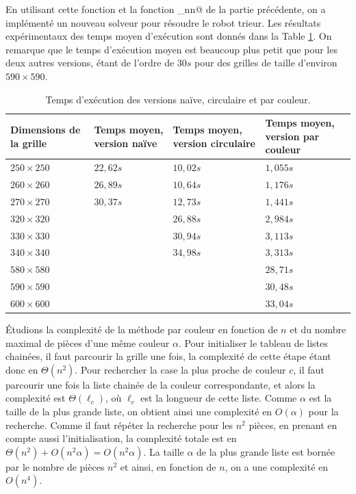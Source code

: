 \documentclass[a4paper,12pt]{article}
\numberwithin{equation}{section}
\begin{document}
En utilisant cette fonction et la fonction \verb@Recherche@\allowbreak\verb@CaseCirculaire_nn@ de la partie précédente, on a implémenté un nouveau solveur pour résoudre le robot trieur. Les résultats expérimentaux des temps moyen d'exécution sont donnés dans la Table \ref{TempsCouleur}. On remarque que le temps d'exécution moyen est beaucoup plus petit que pour les deux autres versions, étant de l'ordre de $30 s$ pour des grilles de taille d'environ $590 \times 590$.

\begin{table}[ht]
\centering
\begin{tabular}{>{\centering} m{} >{\centering} m{} >{\centering} m{} >{\centering} m{}}
\hline\hline
Dimensions de la grille & Temps moyen, version naïve & Temps moyen, version circulaire & Temps moyen, version par couleur \tabularnewline
\hline
$250 \times 250$ & $22,62 s$ & $10,02 s$ & $1,055 s$ \tabularnewline
$260 \times 260$ & $26,89 s$ & $10,64 s$ & $1,176 s$ \tabularnewline
$270 \times 270$ & $30,37 s$ & $12,73 s$ & $1,441 s$ \tabularnewline
$320 \times 320$ &           & $26,88 s$ & $2,984 s$ \tabularnewline
$330 \times 330$ &           & $30,94 s$ & $3,113 s$ \tabularnewline
$340 \times 340$ &           & $34,98 s$ & $3,313 s$ \tabularnewline
$580 \times 580$ &           &           & $28,71 s$ \tabularnewline
$590 \times 590$ &           &           & $30,48 s$ \tabularnewline
$600 \times 600$ &           &           & $33,04 s$ \tabularnewline
\hline\hline
\end{tabular}
\caption{Temps d'exécution des versions naïve, circulaire et par couleur.}
\label{TempsCouleur}
\end{table}

Étudions la complexité de la méthode par couleur en fonction de $n$ et du nombre maximal de pièces d'une même couleur $\alpha$. Pour initialiser le tableau de listes chainées, il faut parcourir la grille une fois, la complexité de cette étape étant donc en $\Theta(n^2)$. Pour rechercher la case la plus proche de couleur $c$, il faut parcourir une fois la liste chainée de la couleur correspondante, et alors la complexité est $\Theta(\ell_c)$, où $\ell_c$ est la longueur de cette liste. Comme $\alpha$ est la taille de la plus grande liste, on obtient ainsi une complexité en $O(\alpha)$ pour la recherche. Comme il faut répéter la recherche pour les $n^2$ pièces, en prenant en compte aussi l'initialisation, la complexité totale est en $\Theta(n^2) + O(n^2 \alpha) = O(n^2 \alpha)$. La taille $\alpha$ de la plus grande liste est bornée par le nombre de pièces $n^2$ et ainsi, en fonction de $n$, on a une complexité en $O(n^4)$.
\end{document}
